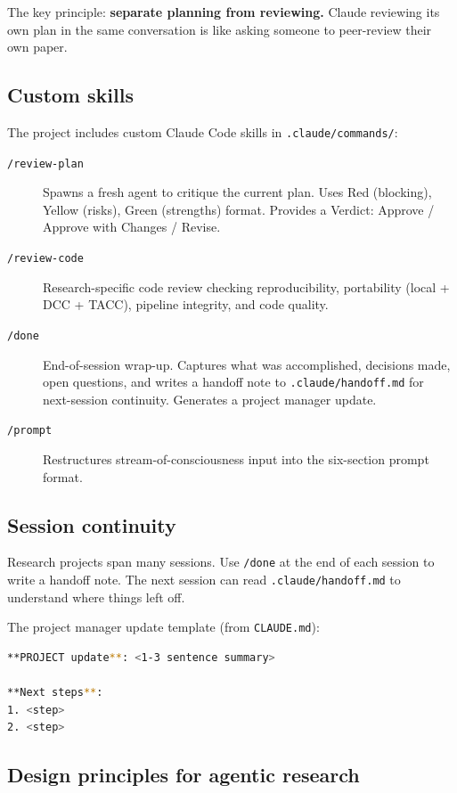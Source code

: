 The key principle: \textbf{separate planning from reviewing.}
Claude reviewing its own plan in the same conversation is like asking someone
to peer-review their own paper.

\subsection{Custom skills}

The project includes custom Claude Code skills in \texttt{.claude/commands/}:

\begin{description}
	\item[\texttt{/review-plan}]
	Spawns a fresh agent to critique the current plan.
	Uses Red (blocking), Yellow (risks), Green (strengths) format.
	Provides a Verdict: Approve / Approve with Changes / Revise.
	\item[\texttt{/review-code}]
	Research-specific code review checking reproducibility,
	portability (local + DCC + TACC), pipeline integrity,
	and code quality.
	\item[\texttt{/done}]
	End-of-session wrap-up.
	Captures what was accomplished, decisions made, open questions,
	and writes a handoff note to \texttt{.claude/handoff.md} for next-session continuity.
	Generates a project manager update.
	\item[\texttt{/prompt}]
	Restructures stream-of-consciousness input into the six-section prompt format.
\end{description}

\subsection{Session continuity}

Research projects span many sessions.
Use \texttt{/done} at the end of each session to write a handoff note.
The next session can read \texttt{.claude/handoff.md} to understand where things left off.

The project manager update template (from \texttt{CLAUDE.md}):
\begin{lstlisting}[language=bash]
**PROJECT update**: <1-3 sentence summary>

**Next steps**:
1. <step>
2. <step>
\end{lstlisting}

\subsection{Design principles for agentic research}

